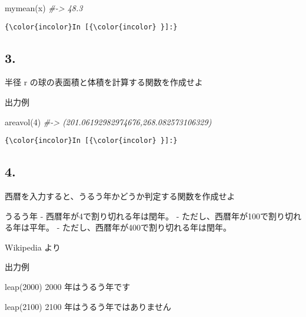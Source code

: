 \documentclass[a4paper,dvipdfmx,uplatex]{jsarticle}
\newenvironment{Shaded}{}{}
\newcommand{\FloatTok}[1]{\textcolor[rgb]{0.25,0.63,0.44}{{#1}}}
\newcommand{\CommentTok}[1]{\textcolor[rgb]{0.38,0.63,0.69}{\textit{{#1}}}}
\newcommand{\NormalTok}[1]{{#1}}
\begin{document}
\begin{Shaded}
\begin{Highlighting}[]
\NormalTok{mymean(x) }\CommentTok{#-> 48.3}
\end{Highlighting}
\end{Shaded}

    \begin{Verbatim}[commandchars=\\\{\}]
{\color{incolor}In [{\color{incolor} }]:} 
\end{Verbatim}

    \subsection{3.}\label{section}

半径 r の球の表面積と体積を計算する関数を作成せよ

出力例

\begin{Shaded}
\begin{Highlighting}[]
\NormalTok{areavol(}\FloatTok{4}\NormalTok{) }\CommentTok{#-> (201.06192982974676,268.082573106329)}
\end{Highlighting}
\end{Shaded}

    \begin{Verbatim}[commandchars=\\\{\}]
{\color{incolor}In [{\color{incolor} }]:} 
\end{Verbatim}

    \subsection{4.}\label{section}

西暦を入力すると、うるう年かどうか判定する関数を作成せよ

うるう年 - 西暦年が4で割り切れる年は閏年。 -
ただし、西暦年が100で割り切れる年は平年。 -
ただし、西暦年が400で割り切れる年は閏年。

Wikipedia より

出力例

\begin{Shaded}
\begin{Highlighting}[]
\NormalTok{leap(}\FloatTok{2000}\NormalTok{)}
\FloatTok{2000} \NormalTok{年はうるう年です}

\NormalTok{leap(}\FloatTok{2100}\NormalTok{)}
\FloatTok{2100} \NormalTok{年はうるう年ではありません}
\end{Highlighting}
\end{Shaded}
\end{document}
